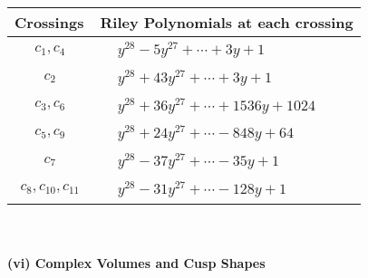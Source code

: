 \documentclass[1p]{elsarticle_modified}
\theoremstyle{definition}
\begin{document}
\begin{tabular}{m{50pt}|m{274pt}}
Crossings & \hspace{64pt}Riley Polynomials at each crossing \\
\hline $$\begin{aligned}c_{1},c_{4}\end{aligned}$$&$\begin{aligned}
&y^{28}-5 y^{27}+\cdots+3 y+1
\end{aligned}$\\
\hline $$\begin{aligned}c_{2}\end{aligned}$$&$\begin{aligned}
&y^{28}+43 y^{27}+\cdots+3 y+1
\end{aligned}$\\
\hline $$\begin{aligned}c_{3},c_{6}\end{aligned}$$&$\begin{aligned}
&y^{28}+36 y^{27}+\cdots+1536 y+1024
\end{aligned}$\\
\hline $$\begin{aligned}c_{5},c_{9}\end{aligned}$$&$\begin{aligned}
&y^{28}+24 y^{27}+\cdots-848 y+64
\end{aligned}$\\
\hline $$\begin{aligned}c_{7}\end{aligned}$$&$\begin{aligned}
&y^{28}-37 y^{27}+\cdots-35 y+1
\end{aligned}$\\
\hline $$\begin{aligned}c_{8},c_{10},c_{11}\end{aligned}$$&$\begin{aligned}
&y^{28}-31 y^{27}+\cdots-128 y+1
\end{aligned}$\\
\hline
\end{tabular}\\~\\
\newpage\flushleft \textbf{(vi) Complex Volumes and Cusp Shapes}
\end{document}
